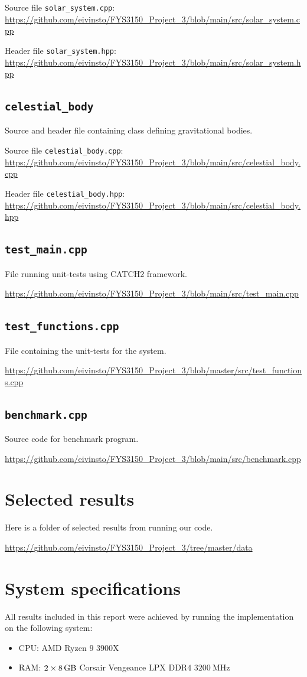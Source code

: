 \documentclass[reprint,english,notitlepage]{revtex4-1}  %
\begin{document}
Source file \verb+solar_system.cpp+:
\url{https://github.com/eivinsto/FYS3150_Project_3/blob/main/src/solar_system.cpp}

Header file \verb+solar_system.hpp+:
\url{https://github.com/eivinsto/FYS3150_Project_3/blob/main/src/solar_system.hpp}

\cprotect\subsection{\verb+celestial_body+} \label{A.5}
Source and header file containing class defining gravitational bodies.

Source file \verb+celestial_body.cpp+:
\url{https://github.com/eivinsto/FYS3150_Project_3/blob/main/src/celestial_body.cpp}

Header file \verb+celestial_body.hpp+:
\url{https://github.com/eivinsto/FYS3150_Project_3/blob/main/src/celestial_body.hpp}

\cprotect\subsection{\verb+test_main.cpp+} \label{A.6}
File running unit-tests using CATCH2 framework.

\url{https://github.com/eivinsto/FYS3150_Project_3/blob/main/src/test_main.cpp}

\cprotect\subsection{\verb+test_functions.cpp+} \label{A.7}
File containing the unit-tests for the system.

\url{https://github.com/eivinsto/FYS3150_Project_3/blob/master/src/test_functions.cpp}

\cprotect\subsection{\verb+benchmark.cpp+} \label{A.8}
Source code for benchmark program.

\url{https://github.com/eivinsto/FYS3150_Project_3/blob/main/src/benchmark.cpp}

\newpage
\section{Selected results} \label{B}
Here is a folder of selected results from running our code.

\url{https://github.com/eivinsto/FYS3150_Project_3/tree/master/data}

\newpage
\section{System specifications} \label{C}
All results included in this report were achieved by running the implementation on the following system:
\begin{itemize}
	\item CPU: AMD Ryzen \(9\) \(3900\)X
	\item RAM: \(2\times\SI{8}{\giga\byte}\) Corsair Vengeance LPX DDR\(4\) \(\SI{3200}{\mega\hertz}\)
\end{itemize}
\end{document}
